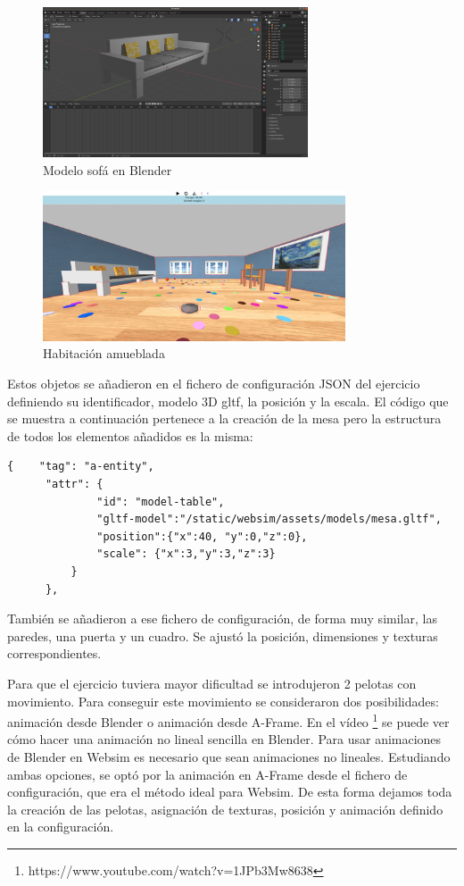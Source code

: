 \begin{figure}[H]
  \centering
 \includegraphics[width=0.7\textwidth]{chapters/images/sofa.png}
  \caption{Modelo sofá en Blender}
\end{figure}

\begin{figure}[H]
\centering
\includegraphics[width=0.8\textwidth, height=0.4\textwidth]{chapters/images/habitacioncon.png}
\caption{Habitación amueblada}
\end{figure}

Estos objetos se añadieron en el fichero de configuración JSON del ejercicio definiendo su identificador, modelo 3D gltf, la posición y la escala. El código que se muestra a continuación pertenece a la creación de la mesa pero la estructura  de todos los elementos añadidos es la misma: 
\begin{lstlisting}
{    "tag": "a-entity",
      "attr": {
              "id": "model-table",
              "gltf-model":"/static/websim/assets/models/mesa.gltf",
              "position":{"x":40, "y":0,"z":0},
              "scale": {"x":3,"y":3,"z":3}
          }
      },
\end{lstlisting}

También se añadieron a ese fichero de configuración, de forma muy similar, las paredes, una puerta y un cuadro. Se ajustó la posición, dimensiones y texturas correspondientes.

Para que el ejercicio tuviera mayor dificultad se introdujeron 2 pelotas con movimiento. Para conseguir este movimiento se consideraron dos posibilidades: animación desde Blender o animación desde A-Frame. 
En el vídeo \footnote{https://www.youtube.com/watch?v=1JPb3Mw8638}  se puede ver cómo hacer una animación no lineal sencilla en Blender. Para usar animaciones de Blender en Websim es necesario que sean animaciones no lineales. Estudiando ambas opciones, se optó por la animación en A-Frame desde el fichero de configuración, que era el método ideal para Websim. De esta forma dejamos toda la creación de las pelotas, asignación de texturas, posición y  animación definido en la configuración.

